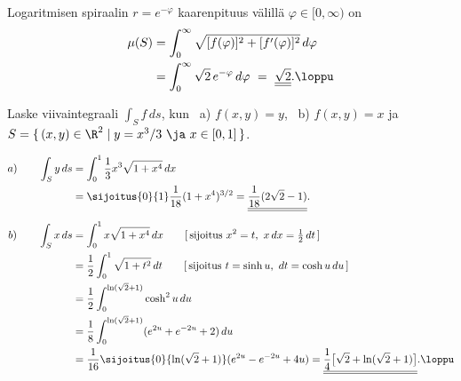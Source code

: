 \begin{multicols}{2}
\begin{Exa}
Logaritmisen spiraalin $r=e^{-\varphi}$ kaarenpituus välillä $\varphi\in [0,\infty)$ on
\begin{align*}
\mu(S) &= \int_0^\infty \sqrt{[f(\varphi)]^2+[f'(\varphi)]^2}\,d\varphi \\
       &= \int_0^\infty \sqrt{2}\,e^{-\varphi}\,d\varphi\
        =\ \underline{\underline{\sqrt{2}}}. \loppu
\end{align*}
\begin{figure}[H]
\begin{center}
\end{center}
\end{figure}
\end{Exa}
\end{multicols}
\begin{Exa}
Laske viivaintegraali $\int_S f\,ds$, kun \ a) $f(x,y)=y$, \ b) $f(x,y)=x$ ja
$S=\{\,(x,y)\in\R^2 \mid y=x^3/3 \ \ja \ x\in [0,1]\,\}$. 
\end{Exa}
\ratk
\begin{align*}
a) \qquad \int_S y\,ds &= \int_0^1 \frac{1}{3}x^3\sqrt{1+x^4}\,dx \\
                       &=\sijoitus{0}{1} \frac{1}{18}(1+x^4)^{3/2}
                        =\underline{\underline{\frac{1}{18}(2\sqrt{2}-1)}}. \\[2mm]
b) \qquad \int_S x\,ds &= \int_0^1 x\sqrt{1+x^4}\,dx \qquad 
                              [\,\text{sijoitus}\ x^2=t, \ x\,dx=\tfrac{1}{2}\,dt\,] \\
                       &=\frac{1}{2}\int_0^1 \sqrt{1+t^2}\,dt \qquad 
                              [\,\text{sijoitus}\ t=\sinh u, \ dt=\cosh u\,du\,] \\
                       &=\frac{1}{2}\int_{0}^{\ln (\sqrt{2}+1)} \cosh^2 u\,du \\
                       &=\frac{1}{8}\int_{0}^{\ln (\sqrt{2}+1)} (e^{2u}+e^{-2u}+2)\,du \\
                       &=\frac{1}{16}\sijoitus{0}{\ln (\sqrt{2}+1)}(e^{2u}-e^{-2u}+4u) 
                        =\underline{\underline{
                         \frac{1}{4}\bigl[\sqrt{2}+\ln(\sqrt{2}+1)\bigr]}}. \loppu
\end{align*}

